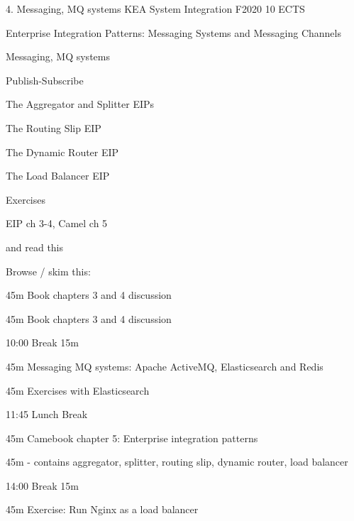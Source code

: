 \documentclass[Screen16to9,17pt]{foils}
\begin{document}
\mytitlepage
{4. Messaging, MQ systems}
{KEA System Integration F2020 10 ECTS}


\begin{list2}
\item Enterprise Integration Patterns: Messaging Systems and Messaging Channels
\item Messaging, MQ systems
\item Publish-Subscribe
\item The Aggregator and Splitter EIPs
\item The Routing Slip EIP
\item The Dynamic Router EIP
\item The Load Balancer EIP
\end{list2}

Exercises
\begin{list2}
\item
\item
\end{list2}




\begin{list1}
\item EIP ch 3-4, Camel ch 5

and read this\\

\item Browse / skim this:\\

\end{list1}



\begin{list2}
\item 45m Book chapters 3 and 4 discussion
\item 45m Book chapters 3 and 4 discussion
\item 10:00 Break 15m
\item 45m Messaging MQ systems: Apache ActiveMQ, Elasticsearch and Redis
\item 45m Exercises with Elasticsearch
\item 11:45 Lunch Break
\item 45m Camebook chapter 5: Enterprise integration patterns
\item 45m - contains aggregator, splitter, routing slip, dynamic router, load balancer
\item 14:00 Break 15m
\item 45m Exercise: Run Nginx as a load balancer
\end{list2}
\end{document}
